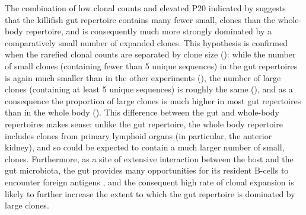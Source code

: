 The combination of low clonal counts and elevated P20 indicated by  suggests that the killifish gut repertoire contains many fewer small, \naive clones than the whole-body repertoire, and is consequently much more strongly dominated by a comparatively small number of expanded clones. This hypothesis is confirmed when the rarefied clonal counts are separated by clone size (): while the number of small clones (containing fewer than 5 unique sequences) in the gut repertoires is again much smaller than in the other experiments (), the number of large clones (containing at least 5 unique sequences) is roughly the same (), and as a consequence the proportion of large clones is much higher in most gut repertoires than in the whole body (). This difference between the gut and whole-body repertoires makes sense: unlike the gut repertoire, the whole body repertoire includes clones from primary lymphoid organs (in particular, the anterior kidney), and so could be expected to contain a much larger number of small, \naive clones. Furthermore, as a site of extensive interaction between the host and the gut microbiota, the gut provides many opportunities for its resident B-cells to encounter foreign antigens\parencite{caruso2009immunosenescence} , and the consequent high rate of clonal expansion is likely to further increase the extent to which the gut repertoire is dominated by large clones.

